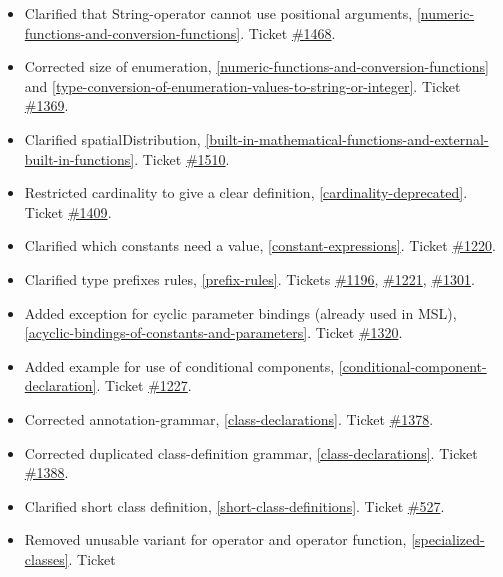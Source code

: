 \documentclass[10pt,a4paper]{report}
\begin{document}
\begin{itemize}
\item
  Clarified that String-operator cannot use positional arguments,
  \ref{numeric-functions-and-conversion-functions}. Ticket
  \href{https://trac.modelica.org/Modelica/ticket/1468}{\#1468}.
\item
  Corrected size of enumeration, \ref{numeric-functions-and-conversion-functions} and \ref{type-conversion-of-enumeration-values-to-string-or-integer}. Ticket
  \href{https://trac.modelica.org/Modelica/ticket/1369}{\#1369}.
\item
  Clarified spatialDistribution, \ref{built-in-mathematical-functions-and-external-built-in-functions}. Ticket
  \href{https://trac.modelica.org/Modelica/ticket/1510}{\#1510}.
\item
  Restricted cardinality to give a clear definition, \ref{cardinality-deprecated}.
  Ticket \href{https://trac.modelica.org/Modelica/ticket/1409}{\#1409}.
\item
  Clarified which constants need a value, \ref{constant-expressions}. Ticket
  \href{https://trac.modelica.org/Modelica/ticket/1220}{\#1220}.
\item
  Clarified type prefixes rules, \ref{prefix-rules}. Tickets
  \href{https://trac.modelica.org/Modelica/ticket/1196}{\#1196},
  \href{https://trac.modelica.org/Modelica/ticket/1221}{\#1221},
  \href{https://trac.modelica.org/Modelica/ticket/1301}{\#1301}.
\item
  Added exception for cyclic parameter bindings (already used in MSL),
  \ref{acyclic-bindings-of-constants-and-parameters}. Ticket
  \href{https://trac.modelica.org/Modelica/ticket/1320}{\#1320}.
\item
  Added example for use of conditional components, \ref{conditional-component-declaration}. Ticket
  \href{https://trac.modelica.org/Modelica/ticket/1227}{\#1227}.
\item
  Corrected annotation-grammar, \ref{class-declarations}. Ticket
  \href{https://trac.modelica.org/Modelica/ticket/1378}{\#1378}.
\item
  Corrected duplicated class-definition grammar, \ref{class-declarations}. Ticket
  \href{https://trac.modelica.org/Modelica/ticket/1388}{\#1388}.
\item
  Clarified short class definition, \ref{short-class-definitions}. Ticket
  \href{https://trac.modelica.org/Modelica/ticket/527}{\#527}.
\item
  Removed unusable variant for operator and operator function, \ref{specialized-classes}. Ticket

\end{itemize}
\end{document}
